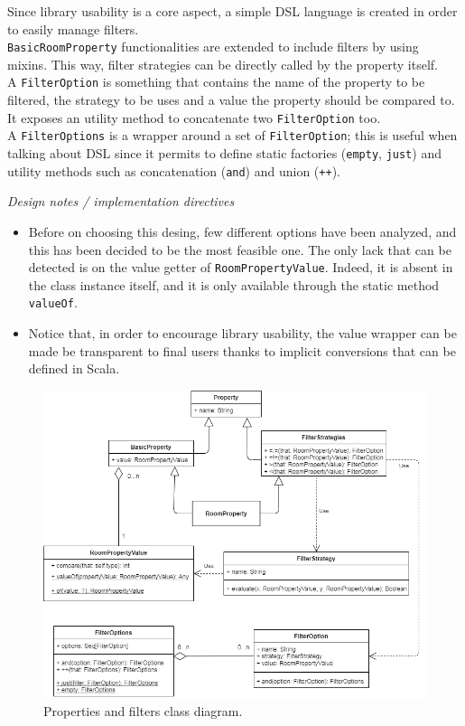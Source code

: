 \bigskip
Since library usability is a core aspect, a simple DSL language is created in order to easily manage filters.
\\
\texttt{BasicRoomProperty} functionalities are extended to include filters by using mixins. This way, filter strategies can be directly called by the property itself.
\\
A \texttt{FilterOption} is something that contains the name of the property to be filtered, the strategy to be uses and a value the property should be compared to. It exposes an utility method to concatenate two \texttt{FilterOption} too.
\\
A \texttt{FilterOptions} is a wrapper around a set of \texttt{FilterOption}; this is useful when talking about DSL since it permits to define static factories (\texttt{empty}, \texttt{just}) and utility methods such as concatenation (\texttt{and}) and union (\texttt{++}).

\bigskip
\textit{Design notes / implementation directives}
\\
\begin{itemize}
\item Before on choosing this desing, few different options have been analyzed, and this has been decided to be the most feasible one. The only lack that can be detected is on the value getter of \texttt{RoomPropertyValue}. Indeed, it is absent in the class instance itself, and it is only available through the static method \texttt{valueOf}.
\item Notice that, in order to encourage library usability, the value wrapper can be made be transparent to final users thanks to implicit conversions that can be defined in Scala.
\end{itemize}

\begin{figure}[h]
	\hspace*{-0.1in}
	\includegraphics[scale=0.55]{images/4-design/property_and_filters-class.png}
	\caption{Properties and filters class diagram.}
	\label{fig:property-class}
\end{figure}


